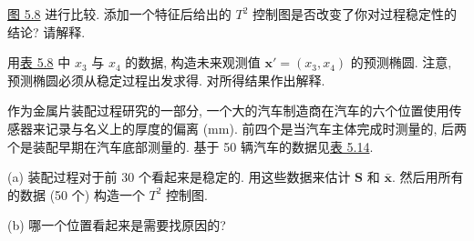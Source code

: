 \hyperref[fig:5.8]{图 5.8} 进行比较. 添加一个特征后给出的 $T^{2}$ 控制图是否改变了你对过程稳定性的结论? 请解释.

\medskip
\noindent{}\quad 用\hyperref[tab:5.8]{表 5.8} 中 $x_{3}$ 与 $x_{4}$ 的数据, 构造未来观测值 $\mathbf{x}'=(x_{3},x_{4})$ 的预测椭圆. 注意, 预测椭圆必须从稳定过程出发求得. 对所得结果作出解释.

\medskip
\noindent{}\quad 作为金属片装配过程研究的一部分, 一个大的汽车制造商在汽车的六个位置使用传感器来记录与名义上的厚度的偏离 (mm). 前四个是当汽车主体完成时测量的, 后两个是装配早期在汽车底部测量的. 基于 50 辆汽车的数据见\hyperref[tab:5.14]{表 5.14}.

\noindent (a) 装配过程对于前 30 个看起来是稳定的. 用这些数据来估计 $\mathbf{S}$ 和 $\bar{\mathbf{x}}$. 然后用所有的数据 (50 个) 构造一个 $T^{2}$ 控制图.

\noindent (b) 哪一个位置看起来是需要找原因的?

